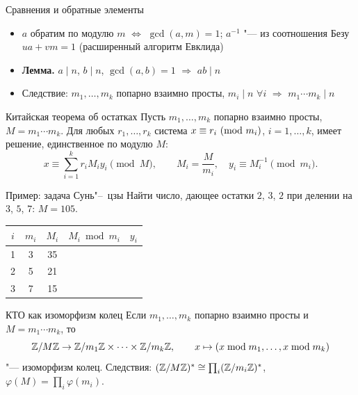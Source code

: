 \documentclass{ca-slides}
\begin{document}
\begin{canvasframe}{Сравнения и обратные элементы}
  \begin{itemize}
    \item $a$ обратим по модулю $m$ $\iff$ $\gcd(a, m) = 1$; $a^{-1}$ "--- из соотношения Безу
      $ua + vm = 1$ (расширенный алгоритм Евклида)
    \item \textbf{Лемма.} $a \mid n$, $b \mid n$, $\gcd(a, b) = 1$ $\Rightarrow$ $ab \mid n$
    \item Следствие: $m_1, \dots, m_k$ попарно взаимно просты, $m_i \mid n$ $\forall i$
      $\Rightarrow$ $m_1 \cdots m_k \mid n$
  \end{itemize}
  \proofarea[0.25\textheight]
\end{canvasframe}

\begin{theoremframe}{Китайская теорема об остатках}
  Пусть $m_1, \dots, m_k$ попарно взаимно просты, $M = m_1 \cdots m_k$. Для любых $r_1, \dots, r_k$
  система $x \equiv r_i \ (\mathrm{mod}\ m_i)$, $i = 1, \dots, k$, имеет решение, единственное по модулю $M$:
  \[
    x \equiv \sum_{i=1}^k r_i M_i y_i \pmod M, \qquad M_i = \frac{M}{m_i}, \quad
    y_i \equiv M_i^{-1} \pmod{m_i}.
  \]
\end{theoremframe}

\begin{canvasframe}{Пример: задача Сунь"--~цзы}
  Найти число, дающее остатки $2$, $3$, $2$ при делении на $3$, $5$, $7$: \quad $M = 105$.
  \begin{center}
  \begin{tabular}{c|c|c|c|c}
    $i$ & $m_i$ & $M_i$ & $M_i \bmod m_i$ & $y_i$ \\ \hline
    1 & 3 & 35 & & \\
    2 & 5 & 21 & & \\
    3 & 7 & 15 & &
  \end{tabular}
  \end{center}
  \penspace[0.15\textheight]
\end{canvasframe}

\begin{theoremframe}{КТО как изоморфизм колец}
  Если $m_1, \dots, m_k$ попарно взаимно просты и $M = m_1 \cdots m_k$, то
  \[
    \mathbb{Z}/M\mathbb{Z} \to \mathbb{Z}/m_1\mathbb{Z} \times \cdots \times \mathbb{Z}/m_k\mathbb{Z}, \qquad x \mapsto (x \bmod m_1, \dots, x \bmod m_k)
  \]
  "--- изоморфизм колец. Следствия: $(\mathbb{Z}/M\mathbb{Z})^{*} \cong \prod_i (\mathbb{Z}/m_i\mathbb{Z})^{*}$,
  $\varphi(M) = \prod_i \varphi(m_i)$.
\end{theoremframe}
\end{document}
